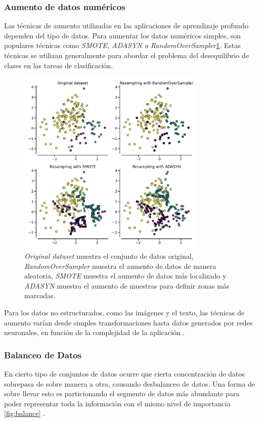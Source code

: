 \documentclass[letter,12pt]{report}
\begin{document}
\subsubsection{Aumento de datos numéricos}
Las técnicas de aumento utilizadas \cite{Augment2} en las aplicaciones de aprendizaje
profundo dependen del tipo de datos. Para aumentar los datos numéricos simples, son
populares técnicas como \textit{SMOTE, ADASYN o RandomOverSampler}\ref{fig:smote}. Estas
técnicas se utilizan generalmente para abordar el problema del desequilibrio de clases en
las tareas de clasificación. 

\begin{figure}[H]
    \centering
    \includegraphics[width=0.8\textwidth]{smote}
    \caption{\textit{Original dataset} muestra el conjunto de datos original,
    \textit{RandomOverSampler} muestra el aumento de datos de manera aleatoria,
\textit{SMOTE} muestra el aumento de datos más localizado y \textit{ADASYN} muestra el
aumento de muestras para definir zonas más marcadas.}
    \label{fig:smote}
\end{figure}

Para los datos no estructurados, como las imágenes y el texto, las técnicas de aumento
varían desde simples transformaciones hasta datos generados por redes neuronales, en
función de la complejidad de la aplicación \cite{Augment3}.

\subsubsection{Balanceo de Datos}
En cierto tipo de conjuntos de datos ocurre que cierta concentración de datos sobrepasa
de sobre manera a otra, causando desbalanceo de datos. Una forma de sobre llevar esto es
particionando el segmento de datos más abundante para poder representar toda la
información con el mismo nivel de importancia \ref{fig:balance} \cite{Balan}.
\end{document}
